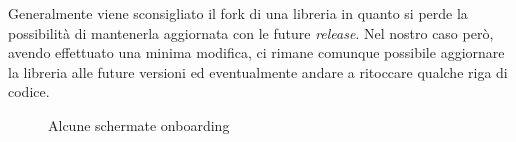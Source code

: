 Generalmente viene sconsigliato il \gls{fork} di una libreria in quanto si perde la possibilità di mantenerla aggiornata con le future \textit{release}. Nel nostro caso però, avendo effettuato una minima modifica, ci rimane comunque possibile aggiornare la libreria alle future versioni ed eventualmente andare a ritoccare qualche riga di codice.\\
\newpage
\begin{center}
\begin{figure}[H]
\hspace{0.1cm}
\hspace{0.1cm}
\caption{Alcune schermate onboarding}
\end{figure}
\end{center}
